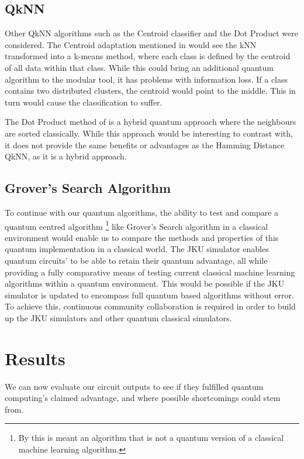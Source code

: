\subsection{QkNN}

Other QkNN algorithms such as the Centroid classifier and the Dot Product were considered. The Centroid adaptation mentioned in \citep{lloydsubQkNNFid} would see the kNN transformed into a k-means method, where each class is defined by the centroid of all data within that class. While this could bring an additional quantum algorithm to the modular tool, it has problems with information loss. If a class contains two distributed clusters, the centroid would point to the middle. This in turn would cause the classification to suffer.

The Dot Product method of \citep{QKNAll} is a hybrid quantum approach where the neighbours are sorted classically. While this approach would be interesting to contrast with, it does not provide the same benefits or advantages as the Hamming Distance QkNN, as it is a hybrid approach.


\subsection{Grover's Search Algorithm}
To continue with our quantum algorithms, the ability to test and compare a quantum centred algorithm \footnote{By this is meant an algorithm that is not a quantum version of a classical machine learning algorithm.} like Grover's Search algorithm in a classical environment would enable us to compare the methods and properties of this quantum implementation in a classical world. The JKU simulator enables quantum circuits' to be able to retain their quantum advantage, all while providing a fully comparative means of testing current classical machine learning algorithms within a quantum environment. %
This would be possible if the JKU simulator is updated to encompass full quantum based algorithms without error. To achieve this, continuous community collaboration is required in order to build up the JKU simulators and other quantum classical simulators. 

\section{Results}
We can now evaluate our circuit outputs to see if they fulfilled quantum computing's claimed advantage, and where possible shortcomings could stem from.

